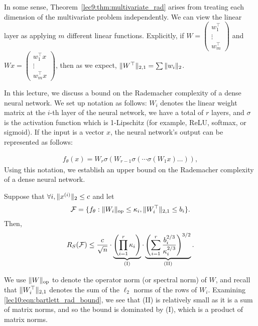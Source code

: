 \begin{remark}
    In some sense, Theorem~\ref{lec9:thm:multivariate_rad} arises from treating each dimension of the multivariate problem independently. We can view the linear layer as applying $m$ different linear functions. Explicitly, if $W = \begin{pmatrix} w_1^\top \\ \vdots \\ w_m^\top \end{pmatrix}$ and $Wx = \begin{pmatrix} w_1^\top x \\ \vdots \\ w_m^\top x \end{pmatrix}$, then as we expect, $\|W^\top\|_{2,1} = \sum \|w_i\|_2$.
\end{remark}


In this lecture, we discuss a bound on the Rademacher complexity of a dense neural network. We set up notation as follows: $W_i$ denotes the linear weight matrix at the $i$-th layer of the neural network, we have a total of $r$ layers, and $\sigma$ is the activation function which is 1-Lipschitz (for example, ReLU, softmax, or sigmoid). If the input is a vector $x$, the neural network's output can be represented as follows:

\begin{align}
    f_\theta(x) = W_r\sigma(W_{r-1}\sigma(\cdots \sigma(W_1x)\ldots)),
\end{align}
Using this notation, we establish an upper bound on the Rademacher complexity of a dense neural network.

\begin{theorem}
\label{lec10:thm:dnn_rademacher}
Suppose that $\forall i, \|x^{(i)}\|_2 \leq c$ and let
\begin{align}
    \mathcal F = \{f_\theta : \|W_i\|_{\textup{op}} \leq \kappa_i, \|W_i^\top\|_{2,1} \leq b_i\}.
\end{align}
Then,
\begin{equation}
    R_S (\mathcal F) \leq \frac{c}{\sqrt{n}} \cdot \underbrace{\left(\prod_{i=1}^r \kappa_i \right)}_{\textup{(I)}} \cdot \underbrace{\left( \sum_{i=1}^r\frac{b_i^{2/3}}{\kappa_i^{2/3}}\right)^{3/2}}_{\textup{(II)}}. \label{lec10:eqn:bartlett_rad_bound}
\end{equation}
\end{theorem}
We use $\|W\|_{\textup{op}}$ to denote the operator norm (or spectral norm) of $W$, and recall that $\|W_i^\top\|_{2,1}$ denotes the sum of the $\ell_2$ norms of the rows of $W_i$. Examining \eqref{lec10:eqn:bartlett_rad_bound}, we see that (II) is relatively small as it is a sum of matrix norms, and so the bound is dominated by (I), which is a product of matrix norms.

